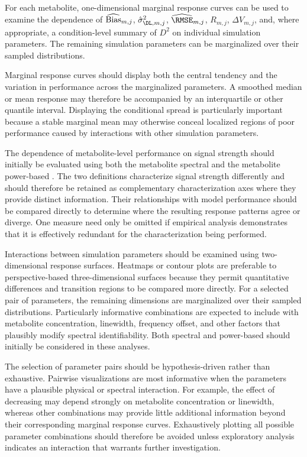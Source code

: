 For each metabolite, one-dimensional marginal response curves can be used to examine the dependence of $\widehat{\textnormal{Bias}}_{m,j}$, $\hat{\sigma}_{\DL,m,j}^{2}$, $\widehat{\RMSE}_{m,j}$, $R_{m,j}$, $\Delta V_{m,j}$, and, where appropriate, a condition-level summary of $D^{2}$ on individual simulation parameters. The remaining simulation parameters can be marginalized over their sampled distributions. 

Marginal response curves should display both the central tendency and the variation in performance across the marginalized parameters. A smoothed median or mean response may therefore be accompanied by an interquartile or other quantile interval. Displaying the conditional spread is particularly important because a stable marginal mean may otherwise conceal localized regions of poor performance caused by interactions with other simulation parameters.

The dependence of metabolite-level performance on signal strength should initially be evaluated using both the metabolite spectral \SNR and the metabolite power-based \SNR. The two definitions characterize signal strength differently and should therefore be retained as complementary characterization axes where they provide distinct information. Their relationships with model performance should be compared directly to determine where the resulting response patterns agree or diverge. One measure need only be omitted if empirical analysis demonstrates that it is effectively redundant for the characterization being performed.

Interactions between simulation parameters should be examined using two-dimensional response surfaces. Heatmaps or contour plots are preferable to perspective-based three-dimensional surfaces because they permit quantitative differences and transition regions to be compared more directly. For a selected pair of parameters, the remaining dimensions are marginalized over their sampled distributions. Particularly informative combinations are expected to include \SNR with metabolite concentration, linewidth, frequency offset, and other factors that plausibly modify spectral identifiability. Both spectral \SNR and power-based \SNR should initially be considered in these analyses.

The selection of parameter pairs should be hypothesis-driven rather than exhaustive. Pairwise visualizations are most informative when the parameters have a plausible physical or spectral interaction. For example, the effect of decreasing \SNR may depend strongly on metabolite concentration or linewidth, whereas other combinations may provide little additional information beyond their corresponding marginal response curves. Exhaustively plotting all possible parameter combinations should therefore be avoided unless exploratory analysis indicates an interaction that warrants further investigation.

